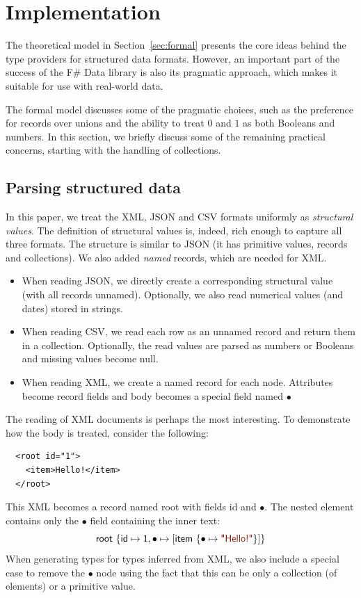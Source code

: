 \documentclass[preprint]{sigplanconf}
\newcommand{\kvd}[1]{\textnormal{\textcolor{kvdclr}{\sffamily #1}}}
\newcommand{\str}[1]{\textnormal{\textcolor{strclr}{\sffamily "#1"}}}
\newcommand{\ident}[1]{\textnormal{\sffamily #1}}
\begin{document}
\section{Implementation}
\label{sec:impl}

The theoretical model in Section~\ref{sec:formal} presents the core ideas behind the type 
providers for structured data formats. However, an important part of the success of the F\# Data
library is also its pragmatic approach, which makes it suitable for use with real-world data.

The formal model discusses some of the pragmatic choices, such as the preference for records over 
unions and the ability to treat $0$ and $1$ as both Booleans and numbers. In this section, we briefly
discuss some of the remaining practical concerns, starting with the handling of collections.


\subsection{Parsing structured data}
\label{sec:impl-parsing}

In this paper, we treat the XML, JSON and CSV formats uniformly as \emph{structural values}.
The definition of structural values is, indeed, rich enough to capture all three formats. The
structure is similar to JSON (it has primitive values, records and collections). We also added
\emph{named} records, which are needed for XML.
%
\begin{itemize}
\item When reading JSON, we directly create a corresponding structural value (with all records unnamed).
  Optionally, we also read numerical values (and dates) stored in strings.
\item When reading CSV, we read each row as an unnamed record and return them in a collection.
  Optionally, the read values are parsed as numbers or Booleans and missing values become \kvd{null}.
\item When reading XML, we create a named record for each node. Attributes become record fields and
  body becomes a special field named $\bullet$
\end{itemize}
%
The reading of XML documents is perhaps the most interesting. To demonstrate how the body is treated,
consider the following:
%
{\small{
\begin{verbatim}
  <root id="1">
    <item>Hello!</item>
  </root>    
\end{verbatim}
}}
%
\noindent
This XML becomes a record named \ident{root} with fields \ident{id} and $\bullet$. The nested element
contains only the $\bullet$ field containing the inner text:
%
\begin{equation*}
\ident{root}~\{ \ident{id} \mapsto 1, \bullet \mapsto [ \ident{item}~\{ \bullet \mapsto \str{Hello!} \}] \}
\end{equation*}
%
When generating types for types inferred from XML, we also include a special case to remove the $\bullet$
node using the fact that this can be only a collection (of elements) or a primitive value.
\end{document}
